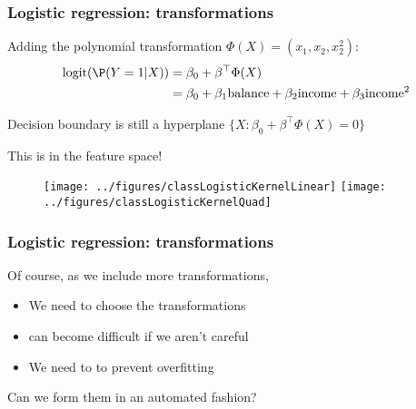 \documentclass[12pt]{beamer}
\begin{document}
\begin{frame}[fragile]
\frametitle{Logistic regression: transformations}

Adding the polynomial transformation $\Phi(X) = (x_1,x_2,x_2^2)$:
\begin{align*}
\textrm{logit}(\P(Y = 1 | X))  
& = 
\beta_0 + \beta^{\top}\Phi(X) \\
& = 
\beta_0 + \beta_1\textrm{balance} +\beta_2\textrm{income}   + \beta_3\textrm{income}^2  
\end{align*}

Decision boundary is still a hyperplane $\{X \!:\! \beta_0 + \beta^{\top} \Phi(X) = 0\}$

\vsp
This is  in the feature space!

\begin{figure}
\centering
\texttt{[image: ../figures/classLogisticKernelLinear]}
\texttt{[image: ../figures/classLogisticKernelQuad]}
\end{figure}

\end{frame}

\begin{frame}[fragile]
\frametitle{Logistic regression: transformations}
Of course, as we include more transformations,

\begin{itemize}
\item We need to choose the transformations 
\item {} can become difficult if we aren't careful


\item We need to  to prevent overfitting
\end{itemize}

\vsp

Can we form them in an automated fashion?
\end{frame}

%
%
%
%
%
%
\end{document}

